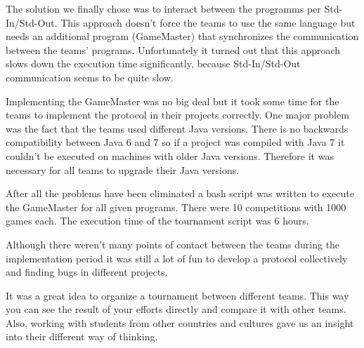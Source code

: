 The solution we finally chose was to interact between the programms per Std-In/Std-Out. This approach doesn't force the teams to use the same language but needs an additional program (GameMaster) that synchronizes the communication between the teams' programs. Unfortunately it turned out that this approach slows down the execution time significantly, because Std-In/Std-Out communication seems to be quite slow.

Implementing the GameMaster was no big deal but it took some time for the teams to implement the protocol in their projects correctly. One major problem was the fact that the teams used different Java versions. There is no backwards compatibility between Java 6 and 7 so if a project was compiled with Java 7 it couldn't be executed on machines with older Java versions. Therefore it was necessary for all teams to upgrade their Java versions.

After all the problems have been eliminated a bash script was written to execute the GameMaster for all given programs. There were 10 competitions with 1000 games each. The execution time of the tournament script was 6 hours.

Although there weren't many points of contact between the teams during the implementation period it was still a lot of fun to develop a protocol collectively and finding bugs in different projects.

It was a great idea to organize a tournament between different teams. This way you can see the result of your efforts directly and compare it with other teams. Also, working with students from other countries and cultures gave us an insight into their different way of thinking.
